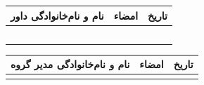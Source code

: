 \documentclass[12pt,a4paper]{article}
\newlength{\colthree}
\begin{document}
\vspace{0.25cm}

\noindent
\begin{tabular}{|>{\centering\arraybackslash}m{\colthree}|>{\centering\arraybackslash}m{\colthree}|>{\centering\arraybackslash}m{\colthree}|}
\hline
\rowcolor{graybg}
\textbf{نام و نام‌خانوادگی داور} & \textbf{امضاء} & \textbf{تاریخ} \\
\hline
& \rule[-0.65cm]{0pt}{1.3cm} & \\
\hline
& \rule[-0.65cm]{0pt}{1.3cm} & \\
\hline
& \rule[-0.65cm]{0pt}{1.3cm} & \\
\hline
& \rule[-0.65cm]{0pt}{1.3cm} & \\
\hline
& \rule[-0.65cm]{0pt}{1.3cm} & \\
\hline
\end{tabular}

\vspace{0.5cm}

\noindent
\begin{tabular}{|>{\centering\arraybackslash}m{\colthree}|>{\centering\arraybackslash}m{\colthree}|>{\centering\arraybackslash}m{\colthree}|}
\hline
\rowcolor{graybg}
\textbf{نام و نام‌خانوادگی مدیر گروه} & \textbf{امضاء} & \textbf{تاریخ} \\
\hline
& \rule[-0.9cm]{0pt}{1.9cm} & \\
\hline
\end{tabular}
\end{document}

